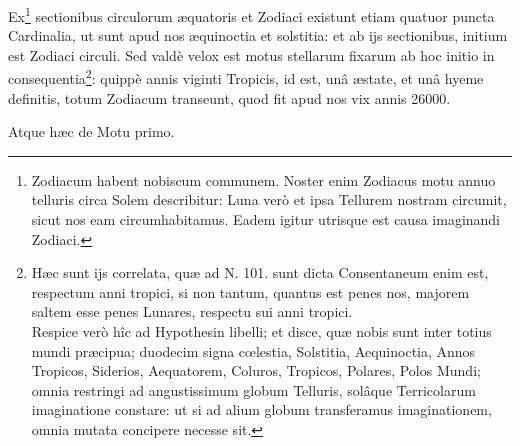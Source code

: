 \documentclass[a4paper, 11pt, oneside, polutonikogreek, german]{article}
\begin{document}
Ex\footnote{Zodiacum habent nobiscum communem. Noster enim Zodiacus motu annuo telluris circa Solem describitur: Luna verò et ipsa Tellurem nostram circumit, sicut nos eam circumhabitamus. Eadem igitur utrisque est causa imaginandi Zodiaci.} sectionibus circulorum æquatoris et Zodiaci existunt etiam quatuor puncta Cardinalia, ut sunt apud nos æquinoctia et solstitia: et ab ijs sectionibus, initium est Zodiaci circuli. Sed valdè velox est motus stellarum fixarum ab hoc initio in consequentia\footnote{Hæc sunt ijs correlata, quæ ad N. 101. sunt dicta Consentaneum enim est, respectum anni tropici, si non tantum, quantus est penes nos, majorem saltem esse penes Lunares, respectu sui anni tropici.\\\hspace*{5mm}Respice verò hîc ad Hypothesin libelli; et disce, quæ nobis sunt inter totius mundi præcipua; duodecim signa cœlestia, Solstitia, Aequinoctia, Annos Tropicos, Siderios, Aequatorem, Coluros, Tropicos, Polares, Polos Mundi; omnia restringi ad angustissimum globum Telluris, solâque Terricolarum imaginatione constare: ut si ad alium globum transferamus imaginationem, omnia mutata concipere necesse sit.}: quippè annis viginti Tropicis, id est, unâ æstate, et unâ hyeme definitis, totum Zodiacum transeunt, quod fit apud nos vix annis 26000.

Atque hæc de Motu primo.
\end{document}
